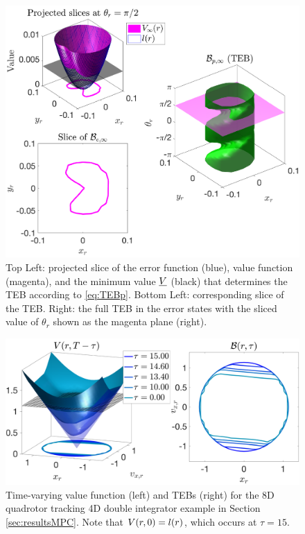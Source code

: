 \begin{figure}
  \includegraphics[width=\columnwidth]{fig/valfunc_illustration}
  \caption{Top Left: projected slice of the error function (blue), value function (magenta), and the minimum value $\underline{V}$ (black) that determines the TEB according to \eqref{eq:TEBp}. Bottom Left: corresponding slice of the TEB. Right: the full TEB in the error states with the sliced value of $\theta_r$ shown as the magenta plane (right).}
  \label{fig:valfunc_illustration}  
\end{figure}

\begin{figure}
	\centering
  \includegraphics[width=\columnwidth]{fig/tv_valfunc}
  \caption{Time-varying value function (left) and TEBs (right) for the 8D quadrotor tracking 4D double integrator example in Section \ref{sec:resultsMPC}. Note that $V(r,0) = l(r)$, which occurs at $\tau = 15$.}  
  \label{fig:vf_TEB:8D4D}
\end{figure} 

